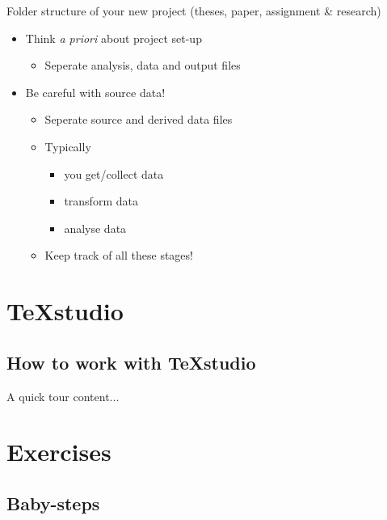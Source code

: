 \documentclass[ignorenonframetext]{beamer}
\begin{document}
{\begin{frame}{Folder structure of your new project (theses, paper, assignment \& research)}

\begin{itemize}
\item
  Think \emph{a priori} about project set-up

  \begin{itemize}
  \item
    Seperate analysis, data and output files
  \end{itemize}
\item
  Be careful with source data!

  \begin{itemize}
  \item
    Seperate source and derived data files
  \item
    Typically

    \begin{itemize}
    \item
      you get/collect data
    \item
      transform data
    \item
      analyse data
    \end{itemize}
  \item
    Keep track of all these stages!
  \end{itemize}
\end{itemize}
\end{frame}


\section{TeXstudio}

\subsection{How to work with TeXstudio}

\begin{frame}{A quick tour}
	content...
\end{frame}

\section{Exercises}

\subsection{Baby-steps}

}
\end{document}
